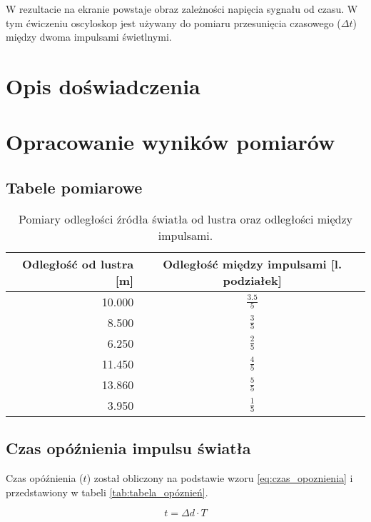 \documentclass[a4paper,12pt]{article}
\begin{document}
W rezultacie na ekranie powstaje obraz zależności napięcia sygnału od czasu. W tym ćwiczeniu oscyloskop jest używany do pomiaru przesunięcia czasowego ($\Delta t$) między dwoma impulsami świetlnymi.


\section{Opis doświadczenia}

\section{Opracowanie wyników pomiarów}

\subsection{Tabele pomiarowe}

\begin{table}[H]
    \centering
    \begin{tabular}{|r|c|}
        \hline
        \textbf{Odległość od lustra [m]} & \textbf{Odległość między impulsami [l. podziałek]} \\ \hline
        \num{10.000} & $\frac{\num{3.5}}{5}$ \\ \hline
        \num{8.500}  & $\frac{3}{5}$ \\ \hline
        \num{6.250}  & $\frac{2}{5}$ \\ \hline
        \num{11.450} & $\frac{4}{5}$ \\ \hline
        \num{13.860} & $\frac{5}{5}$ \\ \hline
        \num{3.950}  & $\frac{1}{5}$ \\ \hline
    \end{tabular}
    \caption{Pomiary odległości źródła światła od lustra oraz odległości między impulsami.}
\end{table}

\subsection{Czas opóźnienia impulsu światła}

Czas opóźnienia ($t$) został obliczony na podstawie wzoru \eqref{eq:czas_opoznienia} i przedstawiony w tabeli \ref{tab:tabela_opóznień}.

\begin{equation}
    \label{eq:czas_opoznienia}
    t = \Delta d \cdot T
\end{equation}
\end{document}
